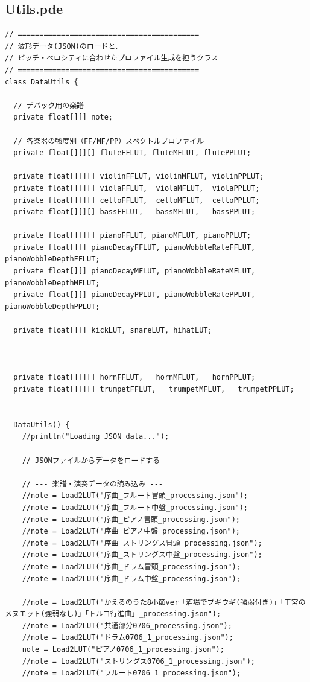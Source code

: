 \subsection{Utils.pde}
\begin{lstlisting}[caption={Utils.pde}, label={lst:proc_utils}]
// ==========================================
// 波形データ(JSON)のロードと、
// ピッチ・ベロシティに合わせたプロファイル生成を担うクラス
// ==========================================
class DataUtils {
  
  // デバック用の楽譜
  private float[][] note;
  
  // 各楽器の強度別（FF/MF/PP）スペクトルプロファイル
  private float[][][] fluteFFLUT, fluteMFLUT, flutePPLUT;
  
  private float[][][] violinFFLUT, violinMFLUT, violinPPLUT;
  private float[][][] violaFFLUT,  violaMFLUT,  violaPPLUT;
  private float[][][] celloFFLUT,  celloMFLUT,  celloPPLUT;
  private float[][][] bassFFLUT,   bassMFLUT,   bassPPLUT;
  
  private float[][][] pianoFFLUT, pianoMFLUT, pianoPPLUT;
  private float[][] pianoDecayFFLUT, pianoWobbleRateFFLUT, pianoWobbleDepthFFLUT;
  private float[][] pianoDecayMFLUT, pianoWobbleRateMFLUT, pianoWobbleDepthMFLUT;
  private float[][] pianoDecayPPLUT, pianoWobbleRatePPLUT, pianoWobbleDepthPPLUT;
  
  private float[][] kickLUT, snareLUT, hihatLUT;
  
  
  
  private float[][][] hornFFLUT,   hornMFLUT,   hornPPLUT;
  private float[][][] trumpetFFLUT,   trumpetMFLUT,   trumpetPPLUT;
  
  
  DataUtils() {
    //println("Loading JSON data...");
    
    // JSONファイルからデータをロードする
    
    // --- 楽譜・演奏データの読み込み ---
    //note = Load2LUT("序曲_フルート冒頭_processing.json");
    //note = Load2LUT("序曲_フルート中盤_processing.json");
    //note = Load2LUT("序曲_ピアノ冒頭_processing.json");
    //note = Load2LUT("序曲_ピアノ中盤_processing.json");
    //note = Load2LUT("序曲_ストリングス冒頭_processing.json");
    //note = Load2LUT("序曲_ストリングス中盤_processing.json");
    //note = Load2LUT("序曲_ドラム冒頭_processing.json");
    //note = Load2LUT("序曲_ドラム中盤_processing.json");
    
    //note = Load2LUT("かえるのうた8小節ver「酒場でブギウギ(強弱付き)」「王宮のメヌエット(強弱なし)」「トルコ行進曲」_processing.json");
    //note = Load2LUT("共通部分0706_processing.json");
    //note = Load2LUT("ドラム0706_1_processing.json");
    note = Load2LUT("ピアノ0706_1_processing.json");
    //note = Load2LUT("ストリングス0706_1_processing.json");
    //note = Load2LUT("フルート0706_1_processing.json");
    

\end{lstlisting}
